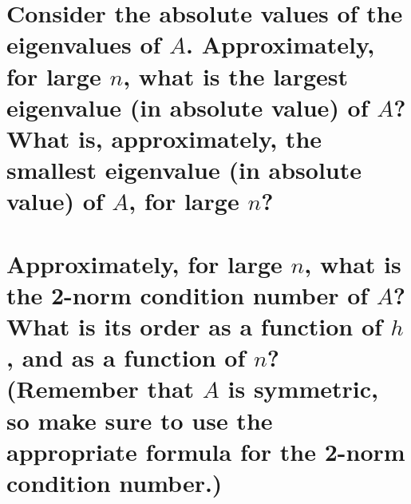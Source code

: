 \documentclass[boxes,pages]{homework}
\begin{document}
\begin{problem}
\begin{parts}
	\part{Consider the absolute values of the eigenvalues of $A$. Approximately, for large $n$, what is the largest eigenvalue (in absolute value) of $A$? What is, approximately, the smallest eigenvalue (in absolute value) of $A$, for large $n$?}\label{part:1a}
	\part{Approximately, for large $n$, what is the 2-norm condition number of $A$? What is its order as a function of $h$, and as a function of $n$? (Remember that $A$ is symmetric, so make sure to use the appropriate formula for the 2-norm condition number.)}\label{part:1b}
\end{parts}
\end{problem}
\end{document}
